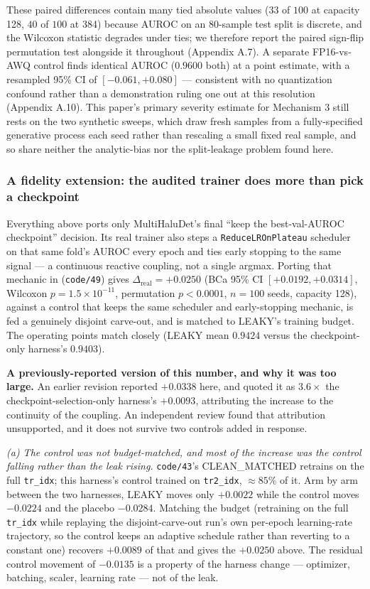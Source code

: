 \documentclass[10pt]{article} %
\begin{document}
These paired differences contain many tied absolute values ($33$ of $100$ at
capacity 128, $40$ of $100$ at 384) because AUROC on an $80$-sample test split
is discrete, and the Wilcoxon statistic degrades under ties; we therefore report
the paired sign-flip permutation test alongside it throughout (Appendix A.7). A
separate FP16-vs-AWQ control finds identical AUROC ($0.9600$ both) at a point
estimate, with a resampled 95\% CI of $[-0.061,+0.080]$ --- consistent with no
quantization confound rather than a demonstration ruling one out at this
resolution (Appendix A.10). This paper's primary severity estimate for
Mechanism 3 still rests on the two synthetic sweeps, which draw fresh samples
from a fully-specified generative process each seed rather than rescaling a
small fixed real sample, and so share neither the analytic-bias nor the
split-leakage problem found here.

\subsubsection{A fidelity extension: the audited trainer does more than pick a checkpoint}

Everything above ports only MultiHaluDet's final ``keep the best-val-AUROC
checkpoint'' decision. Its real trainer also steps a \texttt{ReduceLROnPlateau}
scheduler on that same fold's AUROC every epoch and ties early stopping to the
same signal --- a continuous reactive coupling, not a single argmax. Porting
that mechanic in (\texttt{code/49}) gives
$\Delta_{\text{real}}=\mathbf{+0.0250}$ (BCa 95\% CI $[+0.0192,+0.0314]$,
Wilcoxon $p=1.5\times10^{-11}$, permutation $p<0.0001$, $n=100$ seeds, capacity
128), against a control that keeps the same scheduler and early-stopping
mechanic, is fed a genuinely disjoint carve-out, and is matched to LEAKY's
training budget. The operating points match closely (LEAKY mean $0.9424$
versus the checkpoint-only harness's $0.9403$).

\textbf{A previously-reported version of this number, and why it was too large.}
An earlier revision reported $+0.0338$ here, and quoted it as $3.6\times$ the
checkpoint-selection-only harness's $+0.0093$, attributing the increase to the
continuity of the coupling. An independent review found that attribution
unsupported, and it does not survive two controls added in response.

\emph{(a) The control was not budget-matched, and most of the increase was the
control falling rather than the leak rising.} \texttt{code/43}'s CLEAN\_MATCHED
retrains on the full \texttt{tr\_idx}; this harness's control trained on
\texttt{tr2\_idx}, $\approx$$85\%$ of it. Arm by arm between the two harnesses,
LEAKY moves only $+0.0022$ while the control moves $-0.0224$ and the placebo
$-0.0284$. Matching the budget (retraining on the full \texttt{tr\_idx} while
replaying the disjoint-carve-out run's own per-epoch learning-rate trajectory,
so the control keeps an adaptive schedule rather than reverting to a constant
one) recovers $+0.0089$ of that and gives the $+0.0250$ above. The residual
control movement of $-0.0135$ is a property of the harness change --- optimizer,
batching, scaler, learning rate --- not of the leak.
\end{document}
